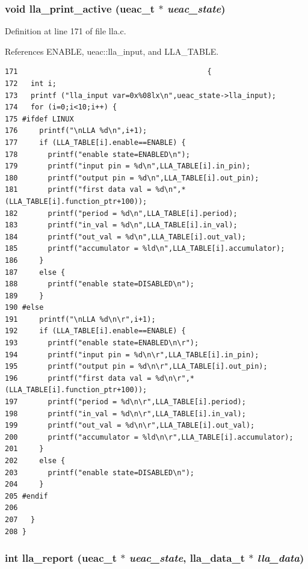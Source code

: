 \subsubsection{\setlength{\rightskip}{0pt plus 5cm}void lla\_\-print\_\-active ({\bf ueac\_\-t} $\ast$ {\em ueac\_\-state})}\label{lla_8c_a10}




Definition at line 171 of file lla.c.

References ENABLE, ueac::lla\_\-input, and LLA\_\-TABLE.

\footnotesize\begin{verbatim}171                                            {
172   int i;
173   printf ("lla_input var=0x%08lx\n",ueac_state->lla_input);
174   for (i=0;i<10;i++) {
175 #ifdef LINUX
176     printf("\nLLA %d\n",i+1);
177     if (LLA_TABLE[i].enable==ENABLE) {
178       printf("enable state=ENABLED\n");
179       printf("input pin = %d\n",LLA_TABLE[i].in_pin);
180       printf("output pin = %d\n",LLA_TABLE[i].out_pin);
181       printf("first data val = %d\n",*(LLA_TABLE[i].function_ptr+100));
182       printf("period = %d\n",LLA_TABLE[i].period);
183       printf("in_val = %d\n",LLA_TABLE[i].in_val);
184       printf("out_val = %d\n",LLA_TABLE[i].out_val);
185       printf("accumulator = %ld\n",LLA_TABLE[i].accumulator);
186     }
187     else {
188       printf("enable state=DISABLED\n");
189     }
190 #else 
191     printf("\nLLA %d\n\r",i+1);
192     if (LLA_TABLE[i].enable==ENABLE) {
193       printf("enable state=ENABLED\n\r");
194       printf("input pin = %d\n\r",LLA_TABLE[i].in_pin);
195       printf("output pin = %d\n\r",LLA_TABLE[i].out_pin);
196       printf("first data val = %d\n\r",*(LLA_TABLE[i].function_ptr+100));
197       printf("period = %d\n\r",LLA_TABLE[i].period);
198       printf("in_val = %d\n\r",LLA_TABLE[i].in_val);
199       printf("out_val = %d\n\r",LLA_TABLE[i].out_val);
200       printf("accumulator = %ld\n\r",LLA_TABLE[i].accumulator);
201     }
202     else {
203       printf("enable state=DISABLED\n");
204     }
205 #endif
206 
207   }
208 }
\end{verbatim}\normalsize 


\subsubsection{\setlength{\rightskip}{0pt plus 5cm}int lla\_\-report ({\bf ueac\_\-t} $\ast$ {\em ueac\_\-state}, {\bf lla\_\-data\_\-t} $\ast$ {\em lla\_\-data})}\label{lla_8c_a5}




